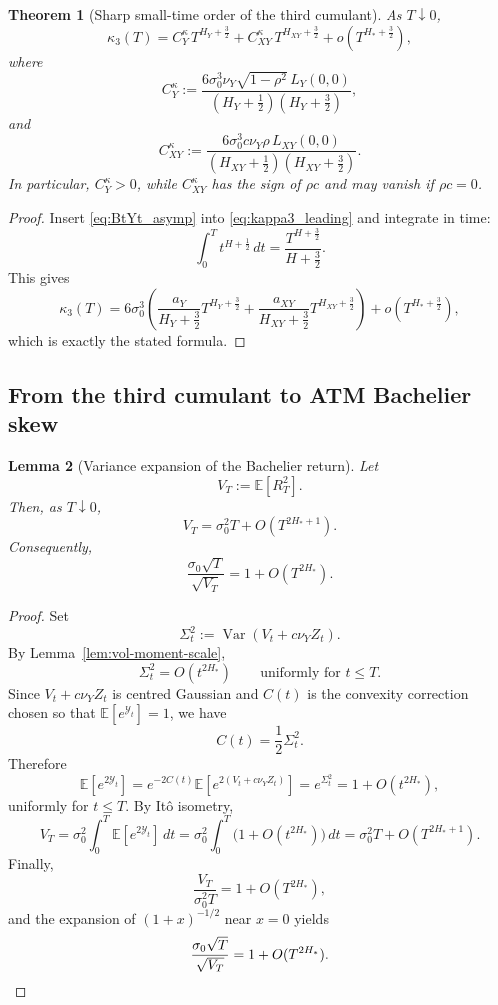 \documentclass[11pt,a4paper]{amsart}
\theoremstyle{plain}
\newtheorem{theorem}{Theorem}[section]
\newtheorem{lemma}[theorem]{Lemma}
\theoremstyle{definition}
\theoremstyle{remark}
\DeclareMathOperator{\Var}{Var}
\newcommand{\EE}{\mathbb{E}}
\begin{document}
\begin{theorem}[Sharp small-time order of the third cumulant]\label{thm:kappa3_asymp}
As $T\downarrow0$,
\[
\kappa_3(T)
=
C_Y^\kappa\,T^{H_Y+\frac32}
+
C_{XY}^\kappa\,T^{H_{XY}+\frac32}
+
o\!\left(T^{H_*+\frac32}\right),
\]
where
\[
C_Y^\kappa
:=
\frac{6\sigma_0^3\nu_Y\sqrt{1-\rho^2}\,L_Y(0,0)}
{\left(H_Y+\frac12\right)\left(H_Y+\frac32\right)},
\]
and
\[
C_{XY}^\kappa
:=
\frac{6\sigma_0^3 c\nu_Y\rho\,L_{XY}(0,0)}
{\left(H_{XY}+\frac12\right)\left(H_{XY}+\frac32\right)}.
\]
In particular, $C_Y^\kappa>0$, while $C_{XY}^\kappa$ has the sign of $\rho c$ and may vanish if $\rho c=0$.
\end{theorem}

\begin{proof}
Insert \eqref{eq:BtYt_asymp} into \eqref{eq:kappa3_leading} and integrate in time:
\[
\int_0^T t^{H+\frac12}\,dt
=
\frac{T^{H+\frac32}}{H+\frac32}.
\]
This gives
\[
\kappa_3(T)
=
6\sigma_0^3
\left(
\frac{a_Y}{H_Y+\frac32}T^{H_Y+\frac32}
+
\frac{a_{XY}}{H_{XY}+\frac32}T^{H_{XY}+\frac32}
\right)
+
o(T^{H_*+\frac32}),
\]
which is exactly the stated formula.
\end{proof}

\subsection{From the third cumulant to ATM Bachelier skew}\label{subsec:cumulant_to_skew}

\begin{lemma}[Variance expansion of the Bachelier return]\label{lem:return-variance}
Let
\[
V_T:=\EE[R_T^2].
\]
Then, as \(T\downarrow0\),
\[
V_T
=
\sigma_0^2T
+
O\!\left(T^{2H_*+1}\right).
\]
Consequently,
\[
\frac{\sigma_0\sqrt T}{\sqrt{V_T}}
=
1+O(T^{2H_*}).
\]
\end{lemma}

\begin{proof}
Set
\[
\Sigma_t^2:=\Var(V_t+c\nu_YZ_t).
\]
By Lemma~\ref{lem:vol-moment-scale},
\[
\Sigma_t^2=O(t^{2H_*})
\qquad\text{uniformly for }t\le T.
\]
Since \(V_t+c\nu_YZ_t\) is centred Gaussian and \(C(t)\) is the convexity correction chosen so that
\(\EE[e^{\mathcal Y_t}]=1\), we have
\[
C(t)=\frac12\Sigma_t^2.
\]
Therefore
\[
\EE[e^{2\mathcal Y_t}]
=
e^{-2C(t)}\EE[e^{2(V_t+c\nu_YZ_t)}]
=
e^{\Sigma_t^2}
=
1+O(t^{2H_*}),
\]
uniformly for \(t\le T\). By It\^o isometry,
\[
V_T
=
\sigma_0^2\int_0^T \EE[e^{2\mathcal Y_t}]\,dt
=
\sigma_0^2\int_0^T \bigl(1+O(t^{2H_*})\bigr)\,dt
=
\sigma_0^2T+O\!\left(T^{2H_*+1}\right).
\]
Finally,
\[
\frac{V_T}{\sigma_0^2T}=1+O(T^{2H_*}),
\]
and the expansion of \((1+x)^{-1/2}\) near \(x=0\) yields
\[
\frac{\sigma_0\sqrt T}{\sqrt{V_T}}
=
1+O(T^{2H_*}).
\qedhere
\]
\end{proof}
\end{document}
